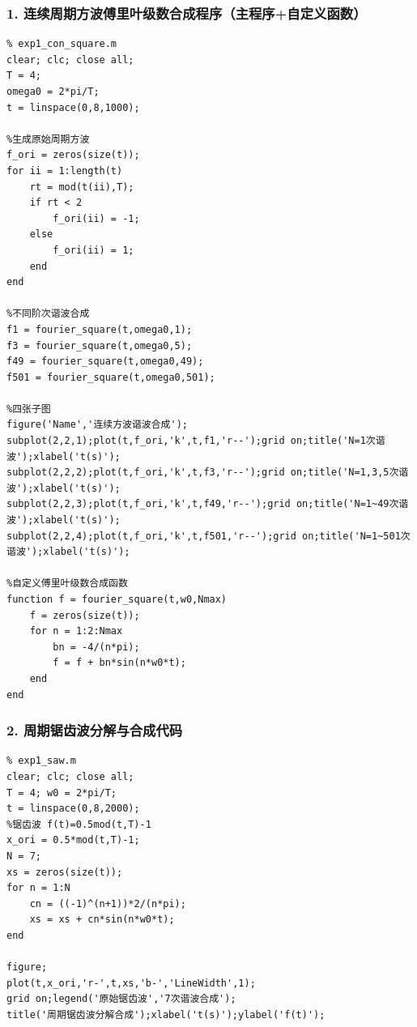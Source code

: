 \subsubsection{1. 连续周期方波傅里叶级数合成程序（主程序+自定义函数）}
\begin{lstlisting}
% exp1_con_square.m
clear; clc; close all;
T = 4;
omega0 = 2*pi/T;
t = linspace(0,8,1000);

%生成原始周期方波
f_ori = zeros(size(t));
for ii = 1:length(t)
    rt = mod(t(ii),T);
    if rt < 2
        f_ori(ii) = -1;
    else
        f_ori(ii) = 1;
    end
end

%不同阶次谐波合成
f1 = fourier_square(t,omega0,1);
f3 = fourier_square(t,omega0,5);
f49 = fourier_square(t,omega0,49);
f501 = fourier_square(t,omega0,501);

%四张子图
figure('Name','连续方波谐波合成');
subplot(2,2,1);plot(t,f_ori,'k',t,f1,'r--');grid on;title('N=1次谐波');xlabel('t(s)');
subplot(2,2,2);plot(t,f_ori,'k',t,f3,'r--');grid on;title('N=1,3,5次谐波');xlabel('t(s)');
subplot(2,2,3);plot(t,f_ori,'k',t,f49,'r--');grid on;title('N=1~49次谐波');xlabel('t(s)');
subplot(2,2,4);plot(t,f_ori,'k',t,f501,'r--');grid on;title('N=1~501次谐波');xlabel('t(s)');

%自定义傅里叶级数合成函数
function f = fourier_square(t,w0,Nmax)
    f = zeros(size(t));
    for n = 1:2:Nmax
        bn = -4/(n*pi);
        f = f + bn*sin(n*w0*t);
    end
end
\end{lstlisting}

\subsubsection{2. 周期锯齿波分解与合成代码}
\begin{lstlisting}
% exp1_saw.m
clear; clc; close all;
T = 4; w0 = 2*pi/T;
t = linspace(0,8,2000);
%锯齿波 f(t)=0.5mod(t,T)-1
x_ori = 0.5*mod(t,T)-1;
N = 7;
xs = zeros(size(t));
for n = 1:N
    cn = ((-1)^(n+1))*2/(n*pi);
    xs = xs + cn*sin(n*w0*t);
end

figure;
plot(t,x_ori,'r-',t,xs,'b-','LineWidth',1);
grid on;legend('原始锯齿波','7次谐波合成');
title('周期锯齿波分解合成');xlabel('t(s)');ylabel('f(t)');
\end{lstlisting}

